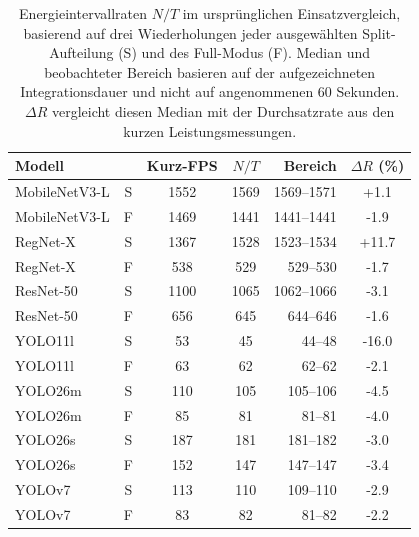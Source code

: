 \begin{table}[!htb]
\centering\small\setlength{\tabcolsep}{3pt}
\caption{Energieintervallraten $N/T$ im ursprünglichen Einsatzvergleich, basierend auf drei Wiederholungen jeder ausgewählten Split-Aufteilung (S) und des Full-Modus (F). Median und beobachteter Bereich basieren auf der aufgezeichneten Integrationsdauer und nicht auf angenommenen 60 Sekunden. $\Delta R$ vergleicht diesen Median mit der Durchsatzrate aus den kurzen Leistungsmessungen.}
\label{tab:review:rates}
\begin{tabular*}{\linewidth}{@{\extracolsep{\fill}}l c S[table-format=4.0] S[table-format=4.0] r S[table-format=+2.1]@{}}
\toprule
Modell & & {Kurz-FPS} & {$N/T$} & {Bereich} & {$\Delta R$ (\%)} \\
\midrule
MobileNetV3-L & S & 1552 & 1569 & 1569--1571 & +1.1 \\
MobileNetV3-L & F & 1469 & 1441 & 1441--1441 & -1.9 \\
RegNet-X & S & 1367 & 1528 & 1523--1534 & +11.7 \\
RegNet-X & F & 538 & 529 & 529--530 & -1.7 \\
ResNet-50 & S & 1100 & 1065 & 1062--1066 & -3.1 \\
ResNet-50 & F & 656 & 645 & 644--646 & -1.6 \\
YOLO11l & S & 53 & 45 & 44--48 & -16.0 \\
YOLO11l & F & 63 & 62 & 62--62 & -2.1 \\
YOLO26m & S & 110 & 105 & 105--106 & -4.5 \\
YOLO26m & F & 85 & 81 & 81--81 & -4.0 \\
YOLO26s & S & 187 & 181 & 181--182 & -3.0 \\
YOLO26s & F & 152 & 147 & 147--147 & -3.4 \\
YOLOv7 & S & 113 & 110 & 109--110 & -2.9 \\
YOLOv7 & F & 83 & 82 & 81--82 & -2.2 \\
\bottomrule\end{tabular*}\end{table}
